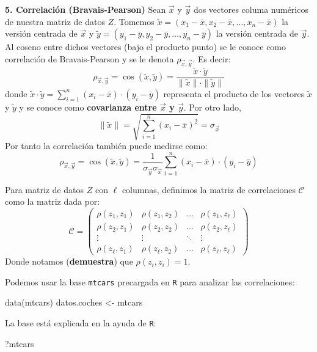 \documentclass[
]{book}
\newenvironment{Shaded}{\begin{snugshade}}{\end{snugshade}}
\newcommand{\FunctionTok}[1]{\textcolor[rgb]{0.00,0.00,0.00}{#1}}
\newcommand{\NormalTok}[1]{#1}
\newcommand{\OtherTok}[1]{\textcolor[rgb]{0.56,0.35,0.01}{#1}}
\begin{document}
\textbf{5. Correlación (Bravais-Pearson)} Sean \(\vec{x}\) y \(\vec{y}\) dos vectores columa numéricos de nuestra matriz de datos \(Z\). Tomemos \(\tilde{x} = (x_1 - \bar{x}, x_2 - \bar{x}, \dots, x_n - \bar{x})\) la versión centrada de \(\vec{x}\) y \(\tilde{y} = (y_1 - \bar{y}, y_2 - \bar{y}, \dots, y_n - \bar{y})\) la versión centrada de \(\vec{y}\).
Al coseno entre dichos vectores (bajo el producto punto) se le conoce como correlación de Bravais-Pearson y se le denota \(\rho_{\vec{x},\vec{y}}\). Es decir:
\[
\rho_{\vec{x},\vec{y}} = \cos(\tilde{x},\tilde{y}) = \dfrac{\tilde{x} \cdot \tilde{y}}{\|\tilde{x}\| \cdot \|\tilde{y}\|}
\]
donde \(\tilde{x}\cdot\tilde{y} = \sum_{i=1}^{n} (x_i - \bar{x}) \cdot (y_i - \bar{y})\) representa el producto de los vectores \(\tilde{x}\) y \(\tilde{y}\) y se conoce como \textbf{covarianza entre \(\vec{x}\) y \(\vec{y}\)}. Por otro lado,
\[
\|\tilde{x}\| = \sqrt{\sum\limits_{i=1}^{n} (x_i - \bar{x})^2} = \sigma_{\vec{x}}
\]
Por tanto la correlación también puede medirse como:
\[
\rho_{\vec{x},\vec{y}} = \cos(\tilde{x},\tilde{y}) = \frac{1}{\sigma_{\vec{y}} \sigma_{\vec{x}}}\sum\limits_{i=1}^{n} (x_i - \bar{x}) \cdot (y_i - \bar{y})  
\]

Para matriz de datos \(Z\) con \(\ell\) columnas, definimos la matriz de correlaciones \(\mathcal{C}\) como la matriz dada por:
\[
\mathcal{C} = \begin{pmatrix}
\rho(z_1,z_1) & \rho(z_1,z_2) & \dots & \rho(z_1,z_{\ell}) \\
\rho(z_2,z_1) & \rho(z_2,z_2) & \dots & \rho(z_2,z_{\ell}) \\
\vdots        & \vdots & \ddots & \vdots \\
\rho(z_{\ell},z_1) & \rho(z_{\ell},z_2) & \dots & \rho(z_{\ell},z_{\ell})
\end{pmatrix}
\]
Donde notamos (\textbf{demuestra}) que \(\rho(z_i, z_i) = 1\).

Podemos usar la base \texttt{mtcars} precargada en \texttt{R} para analizar las correlaciones:

\begin{Shaded}
\begin{Highlighting}[]
\FunctionTok{data}\NormalTok{(mtcars)}
\NormalTok{datos.coches }\OtherTok{\textless{}{-}}\NormalTok{ mtcars}
\end{Highlighting}
\end{Shaded}

La base está explicada en la ayuda de \texttt{R}:

\begin{Shaded}
\begin{Highlighting}[]
\NormalTok{?mtcars}
\end{Highlighting}
\end{Shaded}
\end{document}
